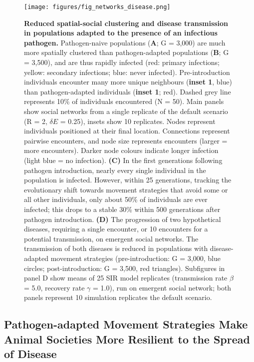 \begin{figure}[p]
    \centering
    \texttt{[image: figures/fig\_networks\_disease.png]}
    \caption{
        \textbf{Reduced spatial-social clustering and disease transmission in populations adapted to the presence of an infectious pathogen.}
        Pathogen-naive populations (\textbf{A}; G = 3,000) are much more spatially clustered than pathogen-adapted populations (\textbf{B}; G = 3,500), and are thus rapidly infected (red: primary infections; yellow: secondary infections; blue: never infected).
        Pre-introduction individuals encounter many more unique neighbours (\textbf{inset 1}, blue) than pathogen-adapted individuals (\textbf{inset 1}; red). 
        Dashed grey line represents 10\% of individuals encountered (N = 50).
        Main panels show social networks from a single replicate of the default scenario (R = 2, $\delta E$ = 0.25), insets show 10 replicates. Nodes represent individuals positioned at their final location. Connections represent pairwise encounters, and node size represents encounters (larger = more encounters). Darker node colours indicate longer infection (light blue = no infection). 
        \textbf{(C)} In the first generations following pathogen introduction, nearly every single individual in the population is infected. However, within 25 generations, tracking the evolutionary shift towards movement strategies that avoid some or all other individuals, only about 50\% of individuals are ever infected; this drops to a stable 30\% within 500 generations after pathogen introduction.
        \textbf{(D)} The progression of two hypothetical diseases, requiring a single encounter, or 10 encounters for a potential transmission, on emergent social networks. 
        The transmission of both diseases is reduced in populations with disease-adapted movement strategies (pre-introduction: G = 3,000, blue circles; post-introduction: G = 3,500, red triangles). Subfigures in panel D show means of 25 SIR model replicates (transmission rate $\beta$ = 5.0, recovery rate $\gamma$ = 1.0), run on emergent social network; both panels represent 10 simulation replicates the default scenario.
    }\label{fig_networks_disease}
\end{figure}

\subsection*{Pathogen-adapted Movement Strategies Make Animal Societies More Resilient to the Spread of Disease}

